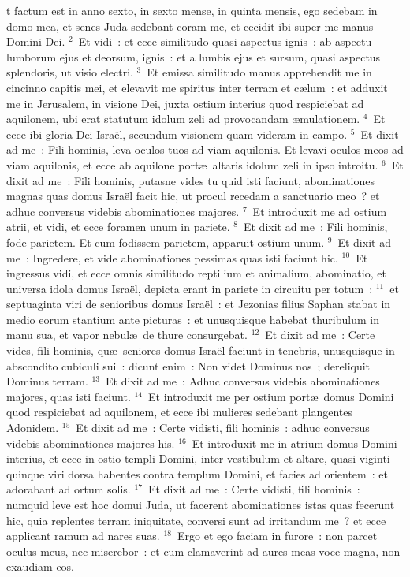 \bchapter
{}t factum est in anno sexto, in sexto mense, in quinta mensis, ego sedebam in domo mea, et senes Juda sedebant coram me, et cecidit ibi super me manus Domini Dei.
${}^{2}$~Et vidi~: et ecce similitudo quasi aspectus ignis~: ab aspectu lumborum ejus et deorsum, ignis~: et a lumbis ejus et sursum, quasi aspectus splendoris, ut visio electri.
${}^{3}$~Et emissa similitudo manus apprehendit me in cincinno capitis mei, et elevavit me spiritus inter terram et c\ae lum~: et adduxit me in Jerusalem, in visione Dei, juxta ostium interius quod respiciebat ad aquilonem, ubi erat statutum idolum zeli ad provocandam \ae mulationem.
${}^{4}$~Et ecce ibi gloria Dei Isra\"el, secundum visionem quam videram in campo.
${}^{5}$~Et dixit ad me~: Fili hominis, leva oculos tuos ad viam aquilonis. Et levavi oculos meos ad viam aquilonis, et ecce ab aquilone port\ae\ altaris idolum zeli in ipso introitu.
${}^{6}$~Et dixit ad me~: Fili hominis, putasne vides tu quid isti faciunt, abominationes magnas quas domus Isra\"el facit hic, ut procul recedam a sanctuario meo~? et adhuc conversus videbis abominationes majores.
${}^{7}$~Et introduxit me ad ostium atrii, et vidi, et ecce foramen unum in pariete.
${}^{8}$~Et dixit ad me~: Fili hominis, fode parietem. Et cum fodissem parietem, apparuit ostium unum.
${}^{9}$~Et dixit ad me~: Ingredere, et vide abominationes pessimas quas isti faciunt hic.
${}^{10}$~Et ingressus vidi, et ecce omnis similitudo reptilium et animalium, abominatio, et universa idola domus Isra\"el, depicta erant in pariete in circuitu per totum~:
${}^{11}$~et septuaginta viri de senioribus domus Isra\"el~: et Jezonias filius Saphan stabat in medio eorum stantium ante picturas~: et unusquisque habebat thuribulum in manu sua, et vapor nebul\ae\ de thure consurgebat.
${}^{12}$~Et dixit ad me~: Certe vides, fili hominis, qu\ae\ seniores domus Isra\"el faciunt in tenebris, unusquisque in abscondito cubiculi sui~: dicunt enim~: Non videt Dominus nos~; dereliquit Dominus terram.
${}^{13}$~Et dixit ad me~: Adhuc conversus videbis abominationes majores, quas isti faciunt.
${}^{14}$~Et introduxit me per ostium port\ae\ domus Domini quod respiciebat ad aquilonem, et ecce ibi mulieres sedebant plangentes Adonidem.
${}^{15}$~Et dixit ad me~: Certe vidisti, fili hominis~: adhuc conversus videbis abominationes majores his.
${}^{16}$~Et introduxit me in atrium domus Domini interius, et ecce in ostio templi Domini, inter vestibulum et altare, quasi viginti quinque viri dorsa habentes contra templum Domini, et facies ad orientem~: et adorabant ad ortum solis.
${}^{17}$~Et dixit ad me~: Certe vidisti, fili hominis~: numquid leve est hoc domui Juda, ut facerent abominationes istas quas fecerunt hic, quia replentes terram iniquitate, conversi sunt ad irritandum me~? et ecce applicant ramum ad nares suas.
${}^{18}$~Ergo et ego faciam in furore~: non parcet oculus meus, nec miserebor~: et cum clamaverint ad aures meas voce magna, non exaudiam eos.

